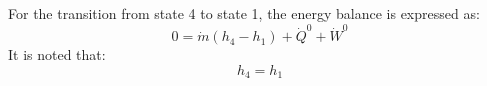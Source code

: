For the transition from state 4 to state 1, the energy balance is expressed as:  
\[
0 = \dot{m} (h_4 - h_1) + \dot{Q}^0 + \dot{W}^0
\]  
It is noted that:  
\[
h_4 = h_1
\]
